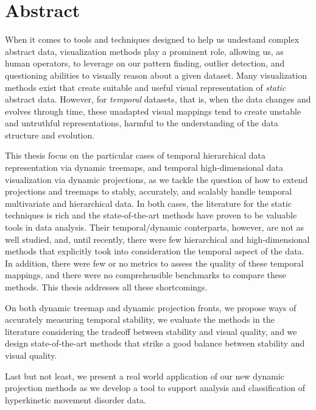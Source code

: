 \begingroup

\let\clearpage\relax
\let\cleardoublepage\relax
\let\cleardoublepage\relax

\manualmark
{} 

\chapter*{Abstract}


When it comes to tools and techniques designed to help us undestand complex abstract data, visualization methods play a prominent role, allowing us, as human operators, to leverage on our pattern finding, outlier detection, and questioning abilities to visually reason about a given dataset.
Many visualization methods exist that create suitable and useful visual representation of \emph{static} abstract data. However, for \emph{temporal} datasets, that is, when the data changes and evolves through time, these unadapted visual mappings tend to create unstable and untruthful representations, harmful to the understanding of the data structure and evolution.

This thesis focus on the particular cases of temporal hierarchical data representation via dynamic treemaps, and temporal high-dimensional data visualization via dynamic projections, as we tackle the question of how to extend projections and treemaps to stably, accurately, and scalably handle temporal multivariate and hierarchical data.
In both cases, the literature for the static techniques is rich and the state-of-the-art methods have proven to be valuable tools in data analysis. Their temporal/dynamic conterparts, however, are not as well studied, and, until recently, there were few hierarchical and high-dimensional methods that explicitly took into consideration the temporal aspect of the data. In addition, there were few or no metrics to assess the quality of these temporal mappings, and there were no comprehensible benchmarks to compare these methods. This thesis addresses all these shortcomings.

On both dynamic treemap and dynamic projection fronts, we propose ways of accurately measuring temporal stability, we evaluate the methods in the literature considering the tradeoff between stability and visual quality, and we design state-of-the-art methods that strike a good balance between stability and visual quality.

Last but not least, we present a real world application of our new dynamic projection methods as we develop a tool to support analysis and classification of hyperkinetic movement disorder data.


